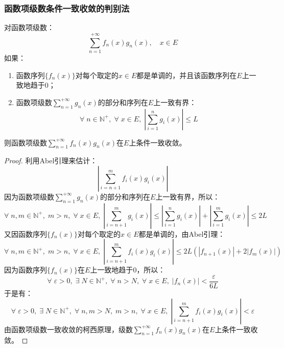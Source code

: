 \subsubsection{函数项级数条件一致收敛的判别法}
\begin{theorem}[Dirichlet判别法]
	对函数项级数：
	\begin{equation*}
		\sum_{n=1}^{+\infty}f_n(x)g_n(x),\quad x\in E
	\end{equation*}
	如果：
	\begin{enumerate}
		\item 函数序列$\{f_n(x)\}$对每个取定的$x\in E$都是单调的，并且该函数序列在$E$上一致地趋于$0$；
		\item 函数项级数$\sum\limits_{n=1}^{+\infty}g_n(x)$的部分和序列在$E$上一致有界：
		\begin{equation*}
			\forall\;n\in\mathbb{N}^+,\;\forall\;x\in E,\;\left|\sum_{i=1}^ng_i(x)\right|\leqslant L
		\end{equation*}
	\end{enumerate}
	则函数项级数$\sum\limits_{n=1}^{+\infty}f_n(x)g_n(x)$在$E$上条件一致收敛。
\end{theorem}
\begin{proof}
	利用Abel引理来估计：
	\begin{equation*}
		\left|\sum_{i=n+1}^mf_i(x)g_i(x)\right|
	\end{equation*}
	因为函数项级数$\sum\limits_{n=1}^{+\infty}g_n(x)$的部分和序列在$E$上一致有界，所以：
	\begin{equation*}
		\forall\;n,m\in\mathbb{N}^+,\;m>n,\;\forall\;x\in E,\;\left|\sum_{i=n+1}^mg_i(x)\right|\leqslant\left|\sum_{i=1}^ng_i(x)\right|+\left|\sum_{i=1}^mg_i(x)\right|\leqslant2L
	\end{equation*}
	又因函数序列$\{f_n(x)\}$对每个取定的$x\in E$都是单调的，由Abel引理：
	\begin{equation*}
		\forall\;n,m\in\mathbb{N}^+,\;m>n,\;\forall\;x\in E,\;\left|\sum_{i=n+1}^mf_i(x)g_i(x)\right|\leqslant2L(|f_{n+1}(x)|+2|f_m(x)|)
	\end{equation*}
	因为函数序列$\{f_n(x)\}$在$E$上一致地趋于$0$，所以：
	\begin{equation*}
		\forall\;\varepsilon>0,\;\exists\;N\in\mathbb{N}^+,\;\forall\;n>N,\;\forall\;x\in E,\;|f_n(x)|<\frac{\varepsilon}{6L}
	\end{equation*}
	于是有：
	\begin{equation*}
		\forall\;\varepsilon>0,\;\exists\;N\in\mathbb{N}^+,\;\forall\;n,m>N,\;m>n,\;\forall\;x\in E,\;\left|\sum_{i=n+1}^mf_i(x)g_i(x)\right|<\varepsilon
	\end{equation*}
	由函数项级数一致收敛的柯西原理，级数$\sum\limits_{n=1}^{+\infty}f_n(x)g_n(x)$在$E$上条件一致收敛。
\end{proof}
